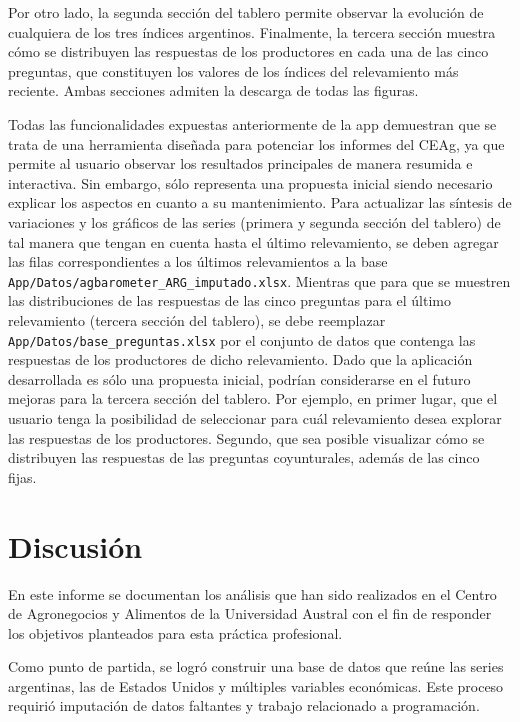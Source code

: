 \documentclass[12pt]{article}
\begin{document}
Por otro lado, la segunda sección del tablero permite observar la
evolución de cualquiera de los tres índices argentinos. Finalmente, la
tercera sección muestra cómo se distribuyen las respuestas de los
productores en cada una de las cinco preguntas, que constituyen los
valores de los índices del relevamiento más reciente. Ambas secciones
admiten la descarga de todas las figuras.

Todas las funcionalidades expuestas anteriormente de la app demuestran
que se trata de una herramienta diseñada para potenciar los informes del
CEAg, ya que permite al usuario observar los resultados principales de
manera resumida e interactiva. Sin embargo, sólo representa una
propuesta inicial siendo necesario explicar los aspectos en cuanto a su
mantenimiento. Para actualizar las síntesis de variaciones y los
gráficos de las series (primera y segunda sección del tablero) de tal
manera que tengan en cuenta hasta el último relevamiento, se deben
agregar las filas correspondientes a los últimos relevamientos a la base
\texttt{App/Datos/agbarometer\_ARG\_imputado.xlsx}. Mientras que para
que se muestren las distribuciones de las respuestas de las cinco
preguntas para el último relevamiento (tercera sección del tablero), se
debe reemplazar \texttt{App/Datos/base\_preguntas.xlsx} por el conjunto
de datos que contenga las respuestas de los productores de dicho
relevamiento. Dado que la aplicación desarrollada es sólo una propuesta
inicial, podrían considerarse en el futuro mejoras para la tercera
sección del tablero. Por ejemplo, en primer lugar, que el usuario tenga
la posibilidad de seleccionar para cuál relevamiento desea explorar las
respuestas de los productores. Segundo, que sea posible visualizar cómo
se distribuyen las respuestas de las preguntas coyunturales, además de
las cinco fijas.

\newpage

\section{Discusión}\label{discusiuxf3n}

En este informe se documentan los análisis que han sido realizados en el
Centro de Agronegocios y Alimentos de la Universidad Austral con el fin
de responder los objetivos planteados para esta práctica profesional.

Como punto de partida, se logró construir una base de datos que reúne
las series argentinas, las de Estados Unidos y múltiples variables
económicas. Este proceso requirió imputación de datos faltantes y
trabajo relacionado a programación.
\end{document}
